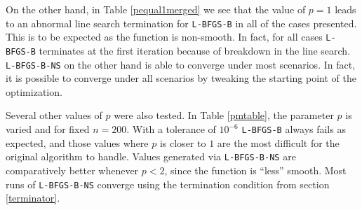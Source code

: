 On the other hand, in Table \ref{pequal1merged} we see that the value of $p = 1$ leads to an abnormal line search termination for \texttt{L-BFGS-B} in all of the cases presented. This is to be expected as the function is non-smooth. In fact, for all cases \texttt{L-BFGS-B} terminates at the first iteration because of breakdown in the line search.  \texttt{L-BFGS-B-NS} on the other hand is able to converge under most scenarios. In fact, it is possible to converge under all scenarios by tweaking the starting point of the optimization.

Several other values of $p$ were also tested. In Table \ref{pmtable}, the parameter $p$ is varied and for fixed $n = 200$. With a tolerance of $10^{-6}$ \texttt{L-BFGS-B} always fails as expected, and those values where $p$ is closer to $1$ are the most difficult for the original algorithm to handle.  Values generated via \texttt{L-BFGS-B-NS} are comparatively better whenever $p < 2$, since the function is ``less'' smooth. Most runs of \texttt{L-BFGS-B-NS} converge using the termination condition from section \ref{terminator}.

